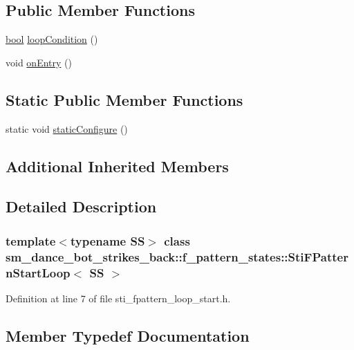 \subsection*{Public Member Functions}
\begin{DoxyCompactItemize}
\item 
\hyperlink{classbool}{bool} \hyperlink{structsm__dance__bot__strikes__back_1_1f__pattern__states_1_1StiFPatternStartLoop_a6afa94fcfe689fa8ab1e1f521d04a8b4}{loop\+Condition} ()
\item 
void \hyperlink{structsm__dance__bot__strikes__back_1_1f__pattern__states_1_1StiFPatternStartLoop_a2f10c47b15ecf1f5aa36781436e3e7aa}{on\+Entry} ()
\end{DoxyCompactItemize}
\subsection*{Static Public Member Functions}
\begin{DoxyCompactItemize}
\item 
static void \hyperlink{structsm__dance__bot__strikes__back_1_1f__pattern__states_1_1StiFPatternStartLoop_a60491b3ac76a720525efcd7df0a26de5}{static\+Configure} ()
\end{DoxyCompactItemize}
\subsection*{Additional Inherited Members}


\subsection{Detailed Description}
\subsubsection*{template$<$typename SS$>$\newline
class sm\+\_\+dance\+\_\+bot\+\_\+strikes\+\_\+back\+::f\+\_\+pattern\+\_\+states\+::\+Sti\+F\+Pattern\+Start\+Loop$<$ S\+S $>$}



Definition at line 7 of file sti\+\_\+fpattern\+\_\+loop\+\_\+start.\+h.



\subsection{Member Typedef Documentation}
\mbox{\label{structsm__dance__bot__strikes__back_1_1f__pattern__states_1_1StiFPatternStartLoop_a2f2035f8c31ad2fb1e29711013ce79fa}} 
